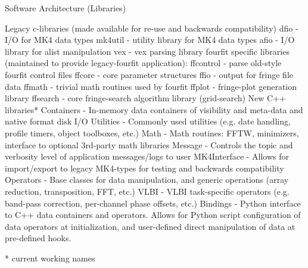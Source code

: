 \documentclass[8pt]{beamer}
\begin{document}
\begin{frame}{Software Architecture (Libraries)}

\begin{outline}
  \1 Legacy c-libraries (made available for re-use and backwards compatibility)
    \2 dfio - I/O for MK4 data types
    \2 mk4util - utility library for MK4 data types
    \2 afio - I/O library for alist manipulation
    \2 vex - vex parsing library
    \2 fourfit specific libraries (maintained to provide legacy-fourfit application):
        \3 ffcontrol - parse old-style fourfit control files 
        \3 ffcore - core parameter structures
        \3 ffio - output for fringe file data
        \3 ffmath - trivial math routines used by fourfit
        \3 ffplot - fringe-plot generation library 
        \3 ffsearch - core fringe-search algorithm library (grid-search)
\1 New C++ libraries* 
    \2 Containers - In-memory data containers of visibility and meta-data and native format disk I/O
    \2 Utilities - Commonly used utilities (e.g. date handling, profile timers, object toolboxes, etc.)
    \2 Math - Math routines: FFTW, minimizers, interface to optional 3rd-party math libraries
    \2 Message - Controls the topic and verbosity level of application messages/logs to user
    \2 MK4Interface - Allows for import/export to legacy MK4-types for testing and backwards compatibility
    \2 Operators - Base classes for data manipulation, and generic operations (array reduction, transposition, FFT, etc.)
    \2 VLBI - VLBI task-specific operators (e.g. band-pass correction, per-channel phase offsets, etc.)
    \2 Bindings - Python interface to C++ data containers and operators. Allows for Python script configuration of data operators at initialization, and user-defined direct manipulation of data at pre-defined hooks.
\end{outline}

* current working names
\end{frame}
\end{document}
